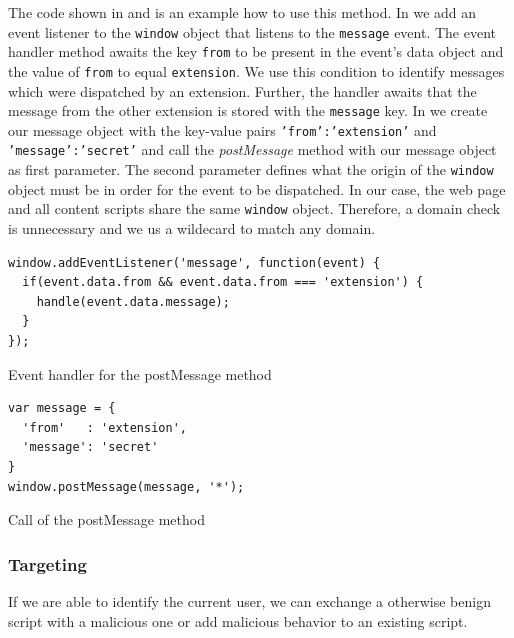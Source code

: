 			The code shown in  and  is an example how to use this method. In  we add an event listener to the \texttt{window} object that listens to the \texttt{message} event. The event handler method awaits the key \texttt{from} to be present in the event's data object and the value of \texttt{from} to equal \texttt{extension}. We use this condition to identify messages which were dispatched by an extension. Further, the handler awaits that the message from the other extension is stored with the \texttt{message} key. In  we create our message object with the key-value pairs \texttt{'from':'extension'} and \texttt{'message':'secret'} and call the \textit{postMessage} method with our message object as first parameter. The second parameter defines what the origin of the \texttt{window} object must be in order for the event to be dispatched. In our case, the web page and all content scripts share the same \texttt{window} object. Therefore, a domain check is unnecessary and we us a wildecard to match any domain.
			
			\begin{code}
				\begin{lstlisting}
window.addEventListener('message', function(event) {
  if(event.data.from && event.data.from === 'extension') {
    handle(event.data.message);
  }
});
				\end{lstlisting}
				\caption{Event handler for the postMessage method}
				\label{postMessageListener}
			\end{code}
			
			\begin{code}
				\begin{lstlisting}
var message = {
  'from'   : 'extension',
  'message': 'secret'
}
window.postMessage(message, '*');
				\end{lstlisting}
				\caption{Call of the postMessage method}
				\label{postMessageMethod}
			\end{code}
		
		\subsubsection{Targeting}
			
			If we are able to identify the current user, we can exchange a otherwise benign script with a malicious one or add malicious behavior to an existing script. 
	
